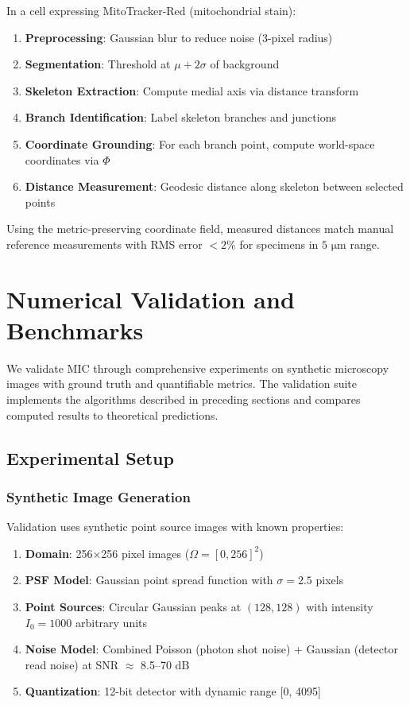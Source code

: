 \documentclass[twocolumn,11pt]{article}
\begin{document}
\begin{example}
In a cell expressing MitoTracker-Red (mitochondrial stain):

\begin{enumerate}
\item \textbf{Preprocessing}: Gaussian blur to reduce noise (3-pixel radius)
\item \textbf{Segmentation}: Threshold at $\mu + 2\sigma$ of background
\item \textbf{Skeleton Extraction}: Compute medial axis via distance transform
\item \textbf{Branch Identification}: Label skeleton branches and junctions
\item \textbf{Coordinate Grounding}: For each branch point, compute world-space coordinates via $\Phi$
\item \textbf{Distance Measurement}: Geodesic distance along skeleton between selected points
\end{enumerate}

Using the metric-preserving coordinate field, measured distances match manual reference measurements with RMS error $< 2\%$ for specimens in $5 \text{ μm}$ range.
\end{example}

\section{Numerical Validation and Benchmarks}

We validate MIC through comprehensive experiments on synthetic microscopy images with ground truth and quantifiable metrics. The validation suite implements the algorithms described in preceding sections and compares computed results to theoretical predictions.

\subsection{Experimental Setup}

\subsubsection{Synthetic Image Generation}

Validation uses synthetic point source images with known properties:
\begin{enumerate}
\item \textbf{Domain}: 256×256 pixel images ($\Omega = [0, 256]^2$)
\item \textbf{PSF Model}: Gaussian point spread function with $\sigma = 2.5$ pixels
\item \textbf{Point Sources}: Circular Gaussian peaks at $(128, 128)$ with intensity $I_0 = 1000$ arbitrary units
\item \textbf{Noise Model}: Combined Poisson (photon shot noise) + Gaussian (detector read noise) at SNR $\approx$ 8.5--70 dB
\item \textbf{Quantization}: 12-bit detector with dynamic range [0, 4095]
\end{enumerate}
\end{document}
